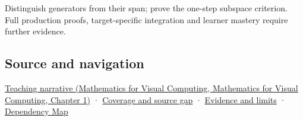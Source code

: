 Distinguish generators from their span; prove the one-step subspace criterion. Full production proofs, target-specific integration and learner mastery require further evidence.

\subsection{Source and navigation}\label{appendix-173b52c063ae-source-and-navigation}

\href{../02-Mathematics-for-Visual-Computing/main.pdf\#nameddest=01-foundations-i-ch017-the-reachable-movements-form-a-vector-space}{Teaching narrative (Mathematics for Visual Computing, Mathematics for Visual Computing, Chapter 1)} · \hyperref[appendix-fd090d982a15-phase-6---parts-501-600]{Coverage and source gap} · \hyperref[appendix-a103e7846d21-phase-6---source-analysis-and-verification]{Evidence and limits} · \hyperref[appendix-4ad47bdd269a]{Dependency Map}
